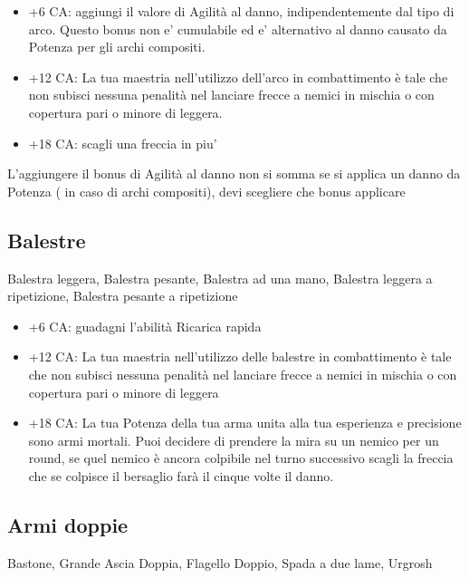 \documentclass[a4paper,11pt,twoside,openany]{book}
\begin{document}
\begin{itemize}

	\item +6 CA: aggiungi il valore di Agilità al danno, indipendentemente dal tipo di arco. Questo bonus non e' cumulabile ed e' alternativo al danno causato da Potenza per gli archi compositi.

	\item +12 CA: La tua maestria nell'utilizzo dell'arco in combattimento è tale che non subisci nessuna penalità nel lanciare frecce a nemici in mischia o con copertura pari o minore di leggera.

	\item +18 CA: scagli una freccia in piu'

\end{itemize}

L'aggiungere il bonus di Agilità al danno non si somma se si applica un danno da Potenza ( in caso di archi compositi), devi scegliere che bonus applicare

\subsection{Balestre}Balestra leggera, Balestra pesante, Balestra ad una mano, Balestra leggera a ripetizione, Balestra pesante a ripetizione

\begin{itemize}

	\item +6 CA: guadagni l'abilità Ricarica rapida

	\item +12 CA: La tua maestria nell'utilizzo delle balestre in combattimento è tale che non subisci nessuna penalità nel lanciare frecce a nemici in mischia o con copertura pari o minore di leggera

	\item +18 CA: La tua Potenza della tua arma unita alla tua esperienza e precisione sono armi mortali. Puoi decidere di prendere la mira su un nemico per un round, se quel nemico è ancora colpibile nel turno successivo scagli la freccia che se colpisce il bersaglio farà il cinque volte il danno.

\end{itemize}

\subsection{Armi doppie} Bastone, Grande Ascia Doppia, Flagello Doppio, Spada a due lame, Urgrosh
\end{document}
